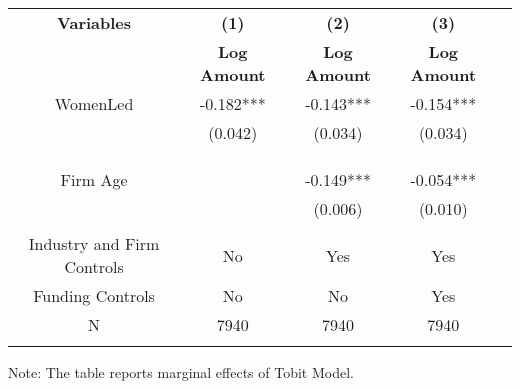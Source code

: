  \begin{table}[htbp]
    \begin{tabular}{c c c c c}
    \toprule
    \textbf{Variables} & \textbf{(1)} & \textbf{(2)} & \textbf{(3)}               \\ 
    \textbf & \textbf{Log Amount} & \textbf{Log Amount} & \textbf{Log Amount}  \\ 

    \midrule
     WomenLed        & -0.182***   &      -0.143*** &       -0.154***   \\
                        &  (0.042)    &      (0.034)   &        (0.034)  \\
                        &             &                &                \\

                        &             &                &               \\
                        &             &                &         \\
    Firm Age            &             &      -0.149*** &     -0.054***    \\
                        &             &      (0.006)   &      (0.010)       \\
                        &             &                &                  \\
    
Industry and Firm Controls   &   No        &   Yes       &        Yes    \\
    Funding Controls    &   No             &   No        &         Yes        \\

    \midrule
     N                  &   7940          &      7940  &     7940        \\          
    \bottomrule
    \addlinespace[1ex]
    \multicolumn{3}{l}{\textsuperscript{***}$P<0.01$, 
      \textsuperscript{**}$P<0.05$, 
      \textsuperscript{*}$P<0.1$}
    \end{tabular}
    \newline
    Note: The table reports marginal effects of Tobit Model.
\end{table}
